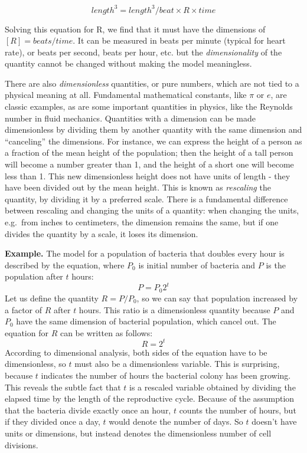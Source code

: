 \documentclass[
]{book}
\begin{document}
\[length^3 = length^3/ beat \times R \times time\]

Solving this equation for R, we find that it must have the dimensions of \([R] = beats/time\). It can be measured in beats per minute (typical for heart rate), or beats per second, beats per hour, etc. but the
\emph{dimensionality} of the quantity cannot be changed without making the model meaningless.

There are also  \emph{dimensionless} quantities, or pure numbers, which are not tied to a physical meaning at all. Fundamental mathematical constants, like \(\pi\) or \(e\), are classic examples, as are some important quantities in physics, like the Reynolds number in fluid mechanics. \citep{strogatz_nonlinear_2001} Quantities with a dimension can be made dimensionless by dividing them by another quantity with the same dimension and ``canceling'' the dimensions. For instance, we can express the height of a person as a fraction of the mean height of the population; then the height of a tall person will become a number greater than 1, and the height of a short one will become less than 1. This new dimensionless height does not have units of length - they have been divided out by the mean height. This is known as  \emph{rescaling} the quantity, by dividing it by a preferred scale. There is a fundamental difference between rescaling and changing the units of a quantity: when changing the units, e.g.~from inches to centimeters, the dimension remains the same, but if one divides the quantity by a scale, it loses its dimension.

\textbf{Example.} The model for a population of bacteria that doubles every hour is described by the equation, where \(P_0\) is initial number of bacteria and \(P\) is the population after \(t\) hours:
\[ P = P_0 2^t \]
Let us define the quantity \(R=P/P_0\), so we can say that population increased by a factor of \(R\) after \(t\) hours. This ratio is a dimensionless quantity because \(P\) and \(P_0\) have the same dimension of bacterial population, which cancel out. The equation for \(R\) can be written as follows:
\[ R= 2^t \]
According to dimensional analysis, both sides of the equation have to be dimensionless, so \(t\) must also be a dimensionless variable. This is surprising, because \(t\) indicates the number of hours the bacterial colony has been growing. This reveals the subtle fact that \(t\) is a rescaled variable obtained by dividing the elapsed time by the length of the reproductive cycle. Because of the assumption that the bacteria divide exactly once an hour, \(t\) counts the number of hours, but if they divided once a day, \(t\) would denote the number of days. So \(t\) doesn't have units or dimensions, but instead denotes the dimensionless number of cell divisions.
\end{document}
